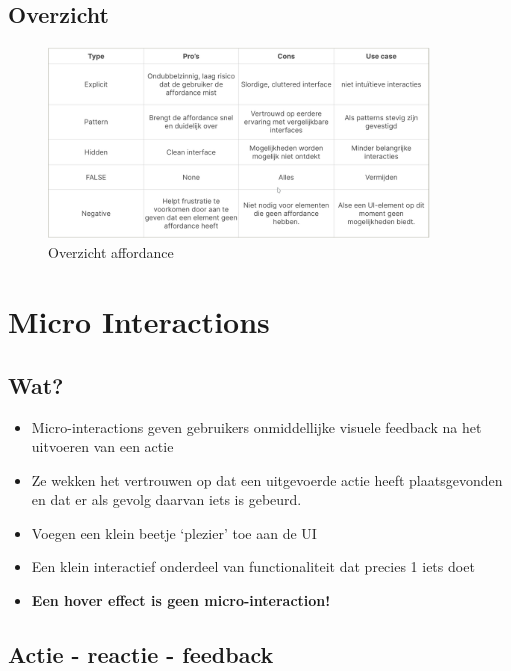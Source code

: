 \documentclass{article}
\newcommand{\bold}[1]{\textbf{#1}}
\begin{document}
\subsection{Overzicht}

\begin{figure}[H]
    \centering
    \includegraphics[width=0.9\textwidth]{affordance.png}
    \caption{Overzicht affordance}
\end{figure}



\section{Micro Interactions}

\subsection{Wat?}

\begin{itemize}
    \item Micro-interactions geven gebruikers onmiddellijke visuele feedback na het uitvoeren van een actie
    \item Ze wekken het vertrouwen op dat een uitgevoerde actie heeft plaatsgevonden en dat er als gevolg daarvan iets is gebeurd.
    \item Voegen een klein beetje `plezier' toe aan de UI
    \item Een klein interactief onderdeel van functionaliteit dat precies 1 iets doet
    \item \bold{Een hover effect is geen micro-interaction!}
\end{itemize}

\subsection{Actie - reactie - feedback}
\end{document}
